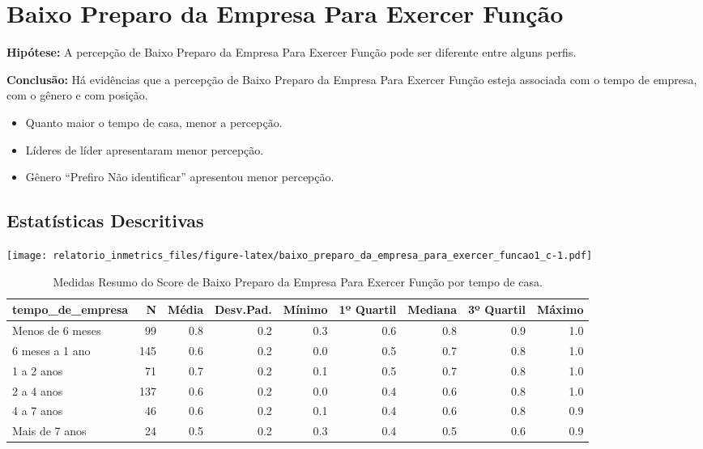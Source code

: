 \documentclass[]{book}
\providecommand{\tightlist}{%
  \setlength{\itemsep}{0pt}\setlength{\parskip}{0pt}}
\begin{document}
\hypertarget{baixo-preparo-da-empresa-para-exercer-funcao-1}{%
\section{Baixo Preparo da Empresa Para Exercer Função}\label{baixo-preparo-da-empresa-para-exercer-funcao-1}}

\textbf{Hipótese:} A percepção de Baixo Preparo da Empresa Para Exercer Função pode ser diferente entre alguns perfis.

\textbf{Conclusão:} Há evidências que a percepção de Baixo Preparo da Empresa Para Exercer Função esteja associada com o tempo de empresa, com o gênero e com posição.

\begin{itemize}
\tightlist
\item
  Quanto maior o tempo de casa, menor a percepção.
\item
  Líderes de líder apresentaram menor percepção.
\item
  Gênero ``Prefiro Não identificar'' apresentou menor percepção.
\end{itemize}

\hypertarget{estatisticas-descritivas-4}{%
\subsection{Estatísticas Descritivas}\label{estatisticas-descritivas-4}}

\texttt{[image: relatorio\_inmetrics\_files/figure-latex/baixo\_preparo\_da\_empresa\_para\_exercer\_funcao1\_c-1.pdf]}

\begin{table}[t]

\caption{\label{tab:unnamed-chunk-18}Medidas Resumo do Score de Baixo Preparo da Empresa Para Exercer Função por tempo de casa.}
\centering
\fontsize{7}{9}\selectfont
\begin{tabular}{lrrrrrrrr}
\toprule
tempo\_de\_empresa & N & Média & Desv.Pad. & Mínimo & 1º Quartil & Mediana & 3º Quartil & Máximo\\
\midrule
Menos de 6 meses & 99 & 0.8 & 0.2 & 0.3 & 0.6 & 0.8 & 0.9 & 1.0\\
6 meses a 1 ano & 145 & 0.6 & 0.2 & 0.0 & 0.5 & 0.7 & 0.8 & 1.0\\
1 a 2 anos & 71 & 0.7 & 0.2 & 0.1 & 0.5 & 0.7 & 0.8 & 1.0\\
2 a 4 anos & 137 & 0.6 & 0.2 & 0.0 & 0.4 & 0.6 & 0.8 & 1.0\\
4 a 7 anos & 46 & 0.6 & 0.2 & 0.1 & 0.4 & 0.6 & 0.8 & 0.9\\
\addlinespace
Mais de 7 anos & 24 & 0.5 & 0.2 & 0.3 & 0.4 & 0.5 & 0.6 & 0.9\\
\bottomrule
\end{tabular}
\end{table}
\end{document}
